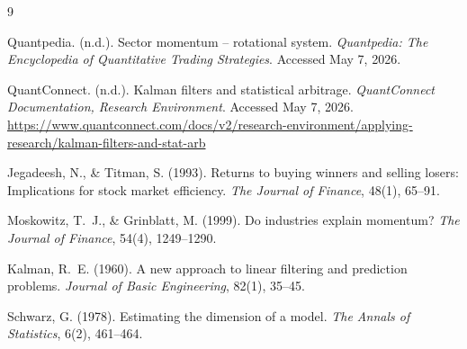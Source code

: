 \documentclass[12pt]{article}
\begin{document}

\begin{thebibliography}{9}

Quantpedia. (n.d.).
\newblock Sector momentum -- rotational system.
\newblock \textit{Quantpedia: The Encyclopedia of Quantitative Trading Strategies}.
\newblock Accessed May 7, 2026.

QuantConnect. (n.d.).
\newblock Kalman filters and statistical arbitrage.
\newblock \textit{QuantConnect Documentation, Research Environment}.
\newblock Accessed May 7, 2026.
\newblock \url{https://www.quantconnect.com/docs/v2/research-environment/applying-research/kalman-filters-and-stat-arb}

Jegadeesh, N., \& Titman, S. (1993).
\newblock Returns to buying winners and selling losers: Implications for stock market efficiency.
\newblock \textit{The Journal of Finance}, 48(1), 65--91.

Moskowitz, T.~J., \& Grinblatt, M. (1999).
\newblock Do industries explain momentum?
\newblock \textit{The Journal of Finance}, 54(4), 1249--1290.

Kalman, R.~E. (1960).
\newblock A new approach to linear filtering and prediction problems.
\newblock \textit{Journal of Basic Engineering}, 82(1), 35--45.

Schwarz, G. (1978).
\newblock Estimating the dimension of a model.
\newblock \textit{The Annals of Statistics}, 6(2), 461--464.

\end{thebibliography}
\end{document}
